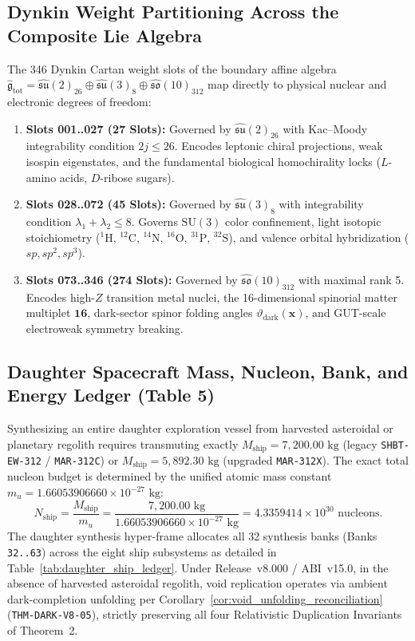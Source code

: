 \documentclass[11pt,onecolumn]{article}
\begin{document}
\subsection{Dynkin Weight Partitioning Across the Composite Lie Algebra}
The 346 Dynkin Cartan weight slots of the boundary affine algebra $\hat{\mathfrak{g}}_{\text{tot}} = \hat{\mathfrak{su}}(2)_{26} \oplus \hat{\mathfrak{su}}(3)_8 \oplus \hat{\mathfrak{so}}(10)_{312}$ map directly to physical nuclear and electronic degrees of freedom:
\begin{enumerate}
    \item \textbf{Slots 001..027 (27 Slots):} Governed by $\hat{\mathfrak{su}}(2)_{26}$ with Kac--Moody integrability condition $2j \le 26$. Encodes leptonic chiral projections, weak isospin eigenstates, and the fundamental biological homochirality locks ($L$-amino acids, $D$-ribose sugars).
    \item \textbf{Slots 028..072 (45 Slots):} Governed by $\hat{\mathfrak{su}}(3)_8$ with integrability condition $\lambda_1 + \lambda_2 \le 8$. Governs $\text{SU}(3)$ color confinement, light isotopic stoichiometry ($^{1}\text{H}, \,^{12}\text{C}, \,^{14}\text{N}, \,^{16}\text{O}, \,^{31}\text{P}, \,^{32}\text{S}$), and valence orbital hybridization ($sp, sp^2, sp^3$).
    \item \textbf{Slots 073..346 (274 Slots):} Governed by $\hat{\mathfrak{so}}(10)_{312}$ with maximal rank 5. Encodes high-$Z$ transition metal nuclei, the 16-dimensional spinorial matter multiplet $\mathbf{16}$, dark-sector spinor folding angles $\vartheta_{\text{dark}}(\mathbf{x})$, and GUT-scale electroweak symmetry breaking.
\end{enumerate}

\FloatBarrier
\subsection{Daughter Spacecraft Mass, Nucleon, Bank, and Energy Ledger (Table 5)}
Synthesizing an entire daughter exploration vessel from harvested asteroidal or planetary regolith requires transmuting exactly $M_{\text{ship}} = 7{,}200.00\text{ kg}$ (legacy \texttt{SHBT-EW-312} / \texttt{MAR-312C}) or $M_{\text{ship}} = 5{,}892.30\text{ kg}$ (upgraded \texttt{MAR-312X}). The exact total nucleon budget is determined by the unified atomic mass constant $m_u = 1.66053906660 \times 10^{-27}\text{ kg}$:
\begin{equation}
N_{\text{ship}} = \frac{M_{\text{ship}}}{m_u} = \frac{7{,}200.00\text{ kg}}{1.66053906660 \times 10^{-27}\text{ kg}} = 4.3359414 \times 10^{30}\text{ nucleons}.
\label{eq:daughter_ship_nucleons}
\end{equation}
The daughter synthesis hyper-frame allocates all 32 synthesis banks (Banks \texttt{32..63}) across the eight ship subsystems as detailed in Table~\ref{tab:daughter_ship_ledger}. Under Release~v8.000 / ABI~v15.0, in the absence of harvested asteroidal regolith, void replication operates via ambient dark-completion unfolding per Corollary~\ref{cor:void_unfolding_reconciliation} (\texttt{THM-DARK-V8-05}), strictly preserving all four Relativistic Duplication Invariants of Theorem~2.
\end{document}

